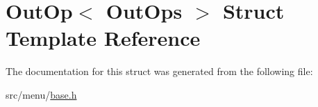 \hypertarget{structOutOp}{}\section{Out\+Op$<$ Out\+Ops $>$ Struct Template Reference}
\label{structOutOp}


The documentation for this struct was generated from the following file\+:\begin{DoxyCompactItemize}
\item 
src/menu/\hyperlink{base_8h}{base.\+h}\end{DoxyCompactItemize}
